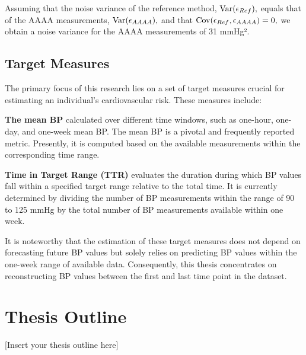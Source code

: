 Assuming that the noise variance of the reference method, $\operatorname{Var}(\epsilon_{Ref}),$
equals that of the AAAA measurements, $\operatorname{Var}(\epsilon_{AAAA}),$ and that
$\operatorname{Cov}(\epsilon_{Ref}, \epsilon_{AAAA})=0,$ we obtain a noise variance for the AAAA
measurements of 31 mmHg².

\subsection{Target Measures}\label{subsec:target-measures}

The primary focus of this research lies on a set of target measures crucial for
estimating an individual's cardiovascular risk. These measures include:

\textbf{The mean BP} calculated over different time windows, such as one-hour,
one-day, and one-week mean BP. The mean BP is a pivotal and frequently reported
metric. Presently, it is computed based on the available measurements within the
corresponding time range.

\textbf{Time in Target Range (TTR)} evaluates the duration during which BP values
fall within a specified target range relative to the total time. It is currently
determined by dividing the number of BP measurements within the range of 90 to
125 mmHg by the total number of BP measurements available within one week.

It is noteworthy that the estimation of these target measures does not depend on
forecasting future BP values but solely relies on predicting BP values within the
one-week range of available data. Consequently, this thesis concentrates on
reconstructing BP values between the first and last time point in the dataset.

\section{Thesis Outline}

[Insert your thesis outline here]